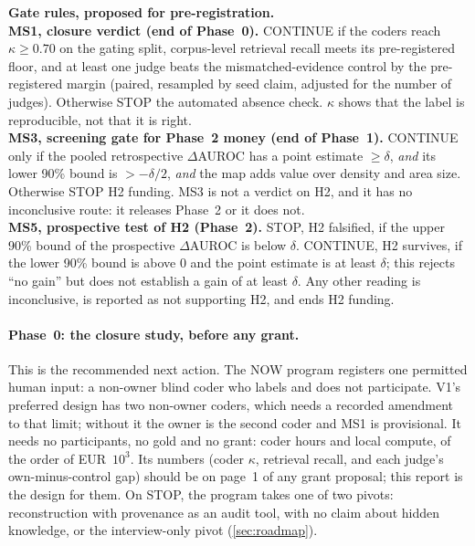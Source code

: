 \begin{evfutbox}
  \textbf{Gate rules, proposed for pre-registration.}\\[2pt]
  \textbf{MS1, closure verdict (end of Phase~0).} CONTINUE if the coders reach $\kappa \geq 0.70$ on
  the gating split, corpus-level retrieval recall meets its pre-registered floor, and at least one
  judge beats the mismatched-evidence control by the pre-registered margin (paired, resampled by seed
  claim, adjusted for the number of judges). Otherwise STOP the automated absence check. $\kappa$ shows
  that the label is reproducible, not that it is right.\\[2pt]
  \textbf{MS3, screening gate for Phase~2 money (end of Phase~1).} CONTINUE only if the pooled
  retrospective $\Delta$AUROC has a point estimate $\geq \delta$, \emph{and} its lower 90\% bound
  is $> -\delta/2$, \emph{and} the map adds value over density and area size. Otherwise STOP H2
  funding. MS3 is not a verdict on H2, and it has no inconclusive route: it releases Phase~2 or it
  does not.\\[2pt]
  \textbf{MS5, prospective test of H2 (Phase~2).} STOP, H2 falsified, if the upper 90\% bound of
  the prospective $\Delta$AUROC is below $\delta$. CONTINUE, H2 survives, if the lower 90\% bound is
  above 0 and the point estimate is at least $\delta$; this rejects \enquote{no gain} but does not
  establish a gain of at least $\delta$. Any other reading is inconclusive, is reported as not
  supporting H2, and ends H2 funding.
\end{evfutbox}

\paragraph{Phase~0: the closure study, before any grant.} \evfut{} This is the recommended next
action. The NOW program registers one permitted human input: a non-owner blind coder who labels and
does not participate. V1's preferred design has two non-owner coders, which needs a recorded amendment
to that limit; without it the owner is the second coder and MS1 is provisional. It needs no participants, no gold and no grant: coder
hours and local compute, of the order of EUR~$10^3$. \evint{} Its numbers (coder $\kappa$,
retrieval recall, and each judge's own-minus-control gap) should be on page~1 of any grant
proposal; this report is the design for them. On STOP, the program takes one of two pivots:
reconstruction with provenance as an audit tool, with no claim about hidden knowledge, or the
interview-only pivot (\cref{sec:roadmap}).


